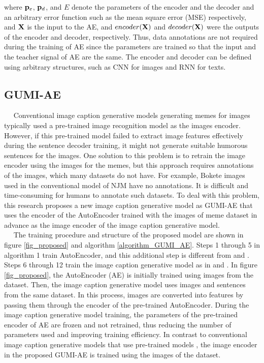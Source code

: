 \documentclass[runningheads]{llncs}
\begin{document}
\noindent where $ {\bf p}_e $, $ {\bf p}_d $, and $ E $ denote the parameters of the encoder and the decoder and an arbitrary error function such as the mean square error (MSE) respectively, and $ {\bf X} $ is the input to the AE, and $ encoder({\bf X}) $ and $ decoder({\bf X}) $ were the outputs of the encoder and decoder, respectively. Thus, data annotations are not required during the training of AE since the parameters are trained so that the input and the teacher signal of AE are the same. The encoder and decoder can be defined using arbitrary structures, such as CNN \cite{ref_CNN} for images and RNN \cite{ref_RNN} for texts. 

\subsection{GUMI-AE} 
~~ Conventional image caption generative models generating memes for images \cite{ref_Dank_Learning,ref_NJM} typically used a pre-trained image recognition model as the images encoder. However, if this pre-trained model failed to extract image features effectively during the sentence decoder training, it might not generate suitable humorous sentences for the images. One solution to this problem is to retrain the image encoder using the images for the memes, but this approach requires annotations of the images, which many datasets do not have. For example, Bokete \cite{ref_Bokete} images used in the conventional model of NJM \cite{ref_NJM} have no annotations. It is difficult and time-consuming for humans to annotate such datasets. To deal with this problem, this research proposes a new image caption generative model as GUMI-AE that uses the encoder of the AutoEncoder trained with the images of meme dataset in advance as the image encoder of the image caption generative model. \\
~~ The training procedure and structure of the proposed model are shown in figure \ref{fig_proposed} and algorithm \ref{algorithm_GUMI_AE}. Steps 1 through 5 in algorithm 1 train AutoEncoder, and this additional step is different from \cite{ref_Dank_Learning} and \cite{ref_NJM}. Steps 6 through 12 train the image caption generative model as in \cite{ref_Dank_Learning} and \cite{ref_NJM}. In figure \ref{fig_proposed}, the AutoEncoder (AE) is initially trained using images from the dataset. Then, the image caption generative model uses images and sentences from the same dataset. In this process, images are converted into features by passing them through the encoder of the pre-trained AutoEncoder. During the image caption generative model training, the parameters of the pre-trained encoder of AE are frozen and not retrained, thus reducing the number of parameters used and improving training efficiency. In contrast to conventional image caption generative models that use pre-trained models \cite{ref_Dank_Learning} \cite{ref_NJM}, the image encoder in the proposed GUMI-AE is trained using the images of the dataset.
\end{document}
